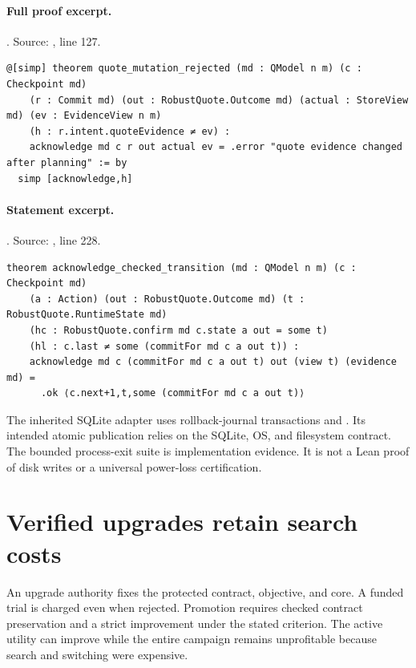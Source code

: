 \documentclass[11pt]{article}
\begin{document}
\paragraph{Full proof excerpt.}. Source: , line 127.
\begin{lstlisting}[style=AVOCSource]
@[simp] theorem quote_mutation_rejected (md : QModel n m) (c : Checkpoint md)
    (r : Commit md) (out : RobustQuote.Outcome md) (actual : StoreView md) (ev : EvidenceView n m)
    (h : r.intent.quoteEvidence ≠ ev) :
    acknowledge md c r out actual ev = .error "quote evidence changed after planning" := by
  simp [acknowledge,h]
\end{lstlisting}

\paragraph{Statement excerpt.}. Source: , line 228.
\begin{lstlisting}[style=AVOCSource]
theorem acknowledge_checked_transition (md : QModel n m) (c : Checkpoint md)
    (a : Action) (out : RobustQuote.Outcome md) (t : RobustQuote.RuntimeState md)
    (hc : RobustQuote.confirm md c.state a out = some t)
    (hl : c.last ≠ some (commitFor md c a out t)) :
    acknowledge md c (commitFor md c a out t) out (view t) (evidence md) =
      .ok ⟨c.next+1,t,some (commitFor md c a out t)⟩
\end{lstlisting}


The inherited SQLite adapter uses rollback-journal transactions and
. Its intended atomic publication relies on the
SQLite, OS, and filesystem contract. The bounded process-exit suite is
implementation evidence. It is not a Lean proof of disk writes or a universal
power-loss certification.

\section{Verified upgrades retain search costs}
An upgrade authority fixes the protected contract, objective, and core. A
funded trial is charged even when rejected. Promotion requires checked contract
preservation and a strict improvement under the stated criterion. The active
utility can improve while the entire campaign remains unprofitable because
search and switching were expensive.
\end{document}
